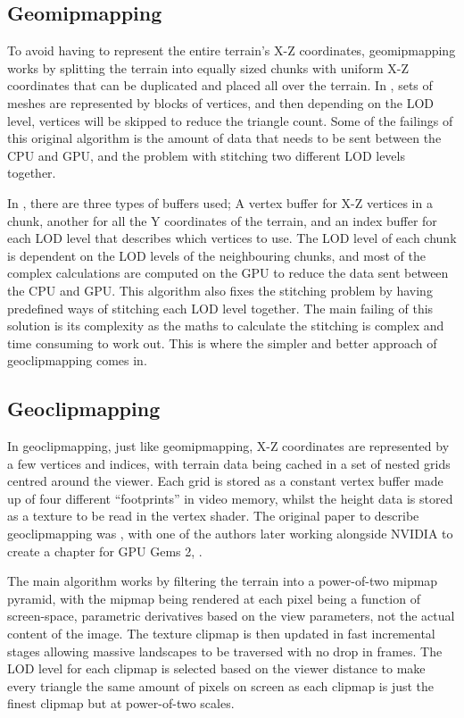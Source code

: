 \documentclass[notitlepage,12pt]{article}
\begin{document}
\subsection{Geomipmapping} \label{geomipmapping}

To avoid having to represent the entire terrain's X-Z coordinates, geomipmapping works by splitting the terrain into equally sized chunks with uniform X-Z coordinates that can be duplicated and placed all over the terrain. In \cite{geomipmapping}, sets of meshes are represented by blocks of vertices, and then depending on the LOD level, vertices will be skipped to reduce the triangle count. Some of the failings of this original algorithm is the amount of data that needs to be sent between the CPU and GPU, and the problem with stitching two different LOD levels together.

In \cite{geomipmappingScape}, there are three types of buffers used; A vertex buffer for X-Z vertices in a chunk, another for all the Y coordinates of the terrain, and an index buffer for each LOD level that describes which vertices to use. The LOD level of each chunk is dependent on the LOD levels of the neighbouring chunks, and most of the complex calculations are computed on the GPU to reduce the data sent between the CPU and GPU. This algorithm also fixes the stitching problem by having predefined ways of stitching each LOD level together. The main failing of this solution is its complexity as the maths to calculate the stitching is complex and time consuming to work out. This is where the simpler and better approach of geoclipmapping comes in.

\subsection{Geoclipmapping}

In geoclipmapping, just like geomipmapping, X-Z coordinates are represented by a few vertices and indices, with terrain data being cached in a set of nested grids centred around the viewer. Each grid is stored as a constant vertex buffer made up of four different ``footprints'' in video memory, whilst the height data is stored as a texture to be read in the vertex shader. The original paper to describe geoclipmapping was \cite{geoclipmapping}, with one of the authors later working alongside NVIDIA to create a chapter for GPU Gems 2, \cite{geoclipmappingGPUGems}.

The main algorithm works by filtering the terrain into a power-of-two mipmap pyramid, with the mipmap being rendered at each pixel being a function of screen-space, parametric derivatives based on the view parameters, not the actual content of the image. The texture clipmap is then updated in fast incremental stages allowing massive landscapes to be traversed with no drop in frames. The LOD level for each clipmap is selected based on the viewer distance to make every triangle the same amount of pixels on screen as each clipmap is just the finest clipmap but at power-of-two scales.
\end{document}
